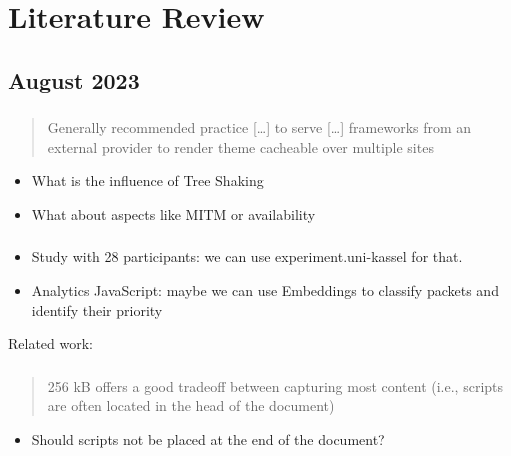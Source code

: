 \chapter*{Literature Review}

\section*{August 2023}

\subsection*{\textcite{zimmermann2017http}}

\begin{quote}
    Generally recommended practice […] to serve […] frameworks from an external provider to render theme cacheable over multiple sites
\end{quote}

\begin{itemize}
    \item What is the influence of Tree Shaking
    \item What about aspects like MITM or availability
\end{itemize}

\subsection*{\textcite{zimmermann2017qoe}}

\begin{itemize}
    \item Study with 28 participants: we can use experiment.uni-kassel for that.
    \item Analytics JavaScript: maybe we can use Embeddings to classify packets and identify their priority
\end{itemize}

Related work: \cite{bocchi2017web,guse2015subjective,kelton2017improving}

\subsection*{\textcite{ruth2018digging}}

\begin{quote}
    256 kB offers a good tradeoff between capturing most content (i.e., scripts are often located in the head of the document)
\end{quote}

\begin{itemize}
    \item Should scripts not be placed at the end of the document?
\end{itemize}

